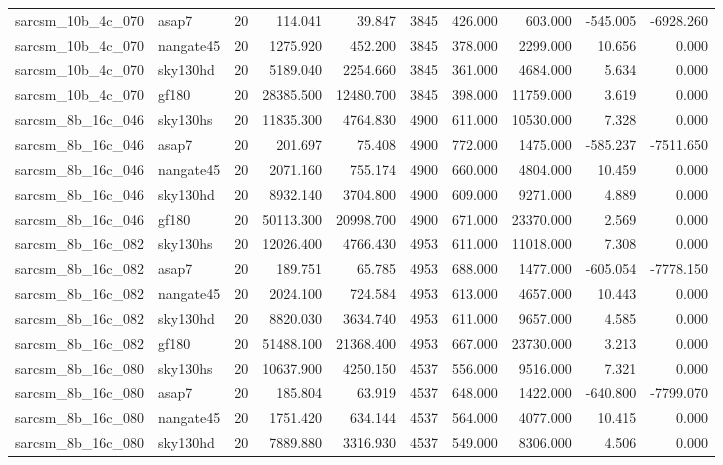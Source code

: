 \begin{tabular}{llrrrrrrrr}
sarcsm\_10b\_4c\_070 & asap7 & 20 & 114.041 & 39.847 & 3845 & 426.000 & 603.000 & -545.005 & -6928.260 \\
sarcsm\_10b\_4c\_070 & nangate45 & 20 & 1275.920 & 452.200 & 3845 & 378.000 & 2299.000 & 10.656 & 0.000 \\
sarcsm\_10b\_4c\_070 & sky130hd & 20 & 5189.040 & 2254.660 & 3845 & 361.000 & 4684.000 & 5.634 & 0.000 \\
sarcsm\_10b\_4c\_070 & gf180 & 20 & 28385.500 & 12480.700 & 3845 & 398.000 & 11759.000 & 3.619 & 0.000 \\
sarcsm\_8b\_16c\_046 & sky130hs & 20 & 11835.300 & 4764.830 & 4900 & 611.000 & 10530.000 & 7.328 & 0.000 \\
sarcsm\_8b\_16c\_046 & asap7 & 20 & 201.697 & 75.408 & 4900 & 772.000 & 1475.000 & -585.237 & -7511.650 \\
sarcsm\_8b\_16c\_046 & nangate45 & 20 & 2071.160 & 755.174 & 4900 & 660.000 & 4804.000 & 10.459 & 0.000 \\
sarcsm\_8b\_16c\_046 & sky130hd & 20 & 8932.140 & 3704.800 & 4900 & 609.000 & 9271.000 & 4.889 & 0.000 \\
sarcsm\_8b\_16c\_046 & gf180 & 20 & 50113.300 & 20998.700 & 4900 & 671.000 & 23370.000 & 2.569 & 0.000 \\
sarcsm\_8b\_16c\_082 & sky130hs & 20 & 12026.400 & 4766.430 & 4953 & 611.000 & 11018.000 & 7.308 & 0.000 \\
sarcsm\_8b\_16c\_082 & asap7 & 20 & 189.751 & 65.785 & 4953 & 688.000 & 1477.000 & -605.054 & -7778.150 \\
sarcsm\_8b\_16c\_082 & nangate45 & 20 & 2024.100 & 724.584 & 4953 & 613.000 & 4657.000 & 10.443 & 0.000 \\
sarcsm\_8b\_16c\_082 & sky130hd & 20 & 8820.030 & 3634.740 & 4953 & 611.000 & 9657.000 & 4.585 & 0.000 \\
sarcsm\_8b\_16c\_082 & gf180 & 20 & 51488.100 & 21368.400 & 4953 & 667.000 & 23730.000 & 3.213 & 0.000 \\
sarcsm\_8b\_16c\_080 & sky130hs & 20 & 10637.900 & 4250.150 & 4537 & 556.000 & 9516.000 & 7.321 & 0.000 \\
sarcsm\_8b\_16c\_080 & asap7 & 20 & 185.804 & 63.919 & 4537 & 648.000 & 1422.000 & -640.800 & -7799.070 \\
sarcsm\_8b\_16c\_080 & nangate45 & 20 & 1751.420 & 634.144 & 4537 & 564.000 & 4077.000 & 10.415 & 0.000 \\
sarcsm\_8b\_16c\_080 & sky130hd & 20 & 7889.880 & 3316.930 & 4537 & 549.000 & 8306.000 & 4.506 & 0.000 \\

\end{tabular}
